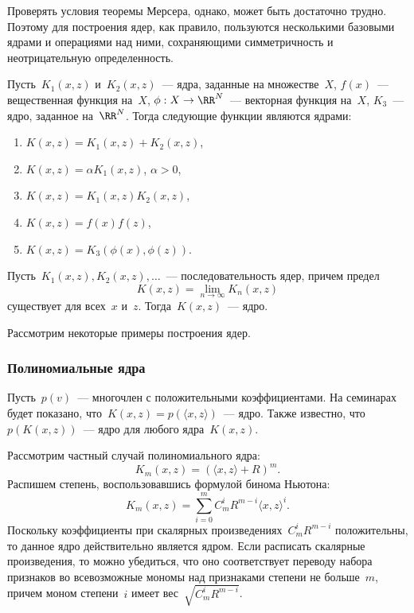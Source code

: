 \documentclass[12pt,fleqn]{article}
\begin{document}
Проверять условия теоремы Мерсера, однако, может быть достаточно трудно.
Поэтому для построения ядер, как правило, пользуются несколькими базовыми
ядрами и операциями над ними, сохраняющими симметричность и неотрицательную
определенность.
\begin{vkTheorem}
\label{th:kernelConstr}
    Пусть~$K_1(x, z)$ и~$K_2(x, z)$~--- ядра, заданные на множестве~$X$,
    $f(x)$~--- вещественная функция на~$X$,
    $\phi: X \to \RR^N$~--- векторная функция на~$X$,
    $K_3$~--- ядро, заданное на~$\RR^N$.
    Тогда следующие функции являются ядрами:
    \begin{enumerate}
        \item $K(x, z) = K_1(x, z) + K_2(x, z)$,
        \item $K(x, z) = \alpha K_1(x, z)$, $\alpha > 0$,
        \item $K(x, z) = K_1(x, z) K_2(x, z)$,
        \item $K(x, z) = f(x) f(z)$,
        \item $K(x, z) = K_3(\phi(x), \phi(z))$.
    \end{enumerate}
\end{vkTheorem}

\begin{vkTheorem}
\label{th:kernelLim}
    Пусть~$K_1(x, z), K_2(x, z), \dots$~--- последовательность ядер,
    причем предел
    \[
        K(x, z)
        =
        \lim_{n \to \infty}
            K_n(x, z)
    \]
    существует для всех~$x$ и~$z$.
    Тогда~$K(x, z)$~--- ядро.
\end{vkTheorem}

Рассмотрим некоторые примеры построения ядер.

\subsubsection{Полиномиальные ядра}
Пусть~$p(v)$~--- многочлен с положительными коэффициентами.
На семинарах будет показано, что~$K(x, z) = p(\langle x, z \rangle)$~--- ядро.
Также известно, что~$p(K(x, z))$~--- ядро для любого ядра~$K(x, z)$.

Рассмотрим частный случай полиномиального ядра:
\[
    K_m(x, z)
    =
    \left(
        \langle x, z \rangle + R
    \right)^m.
\]
Распишем степень, воспользовавшись формулой бинома Ньютона:
\[
    K_m(x, z)
    =
    \sum_{i = 0}^{m}
        C_m^i R^{m - i}
        \langle x, z \rangle^i.
\]
Поскольку коэффициенты при скалярных произведениях~$C_m^i R^{m - i}$
положительны, то данное ядро действительно является ядром.
Если расписать скалярные произведения, то можно убедиться,
что оно соответствует переводу набора признаков
во всевозможные мономы над признаками степени не больше~$m$,
причем моном степени~$i$ имеет вес~$\sqrt{C_m^i R^{m - i}}$.
\end{document}
